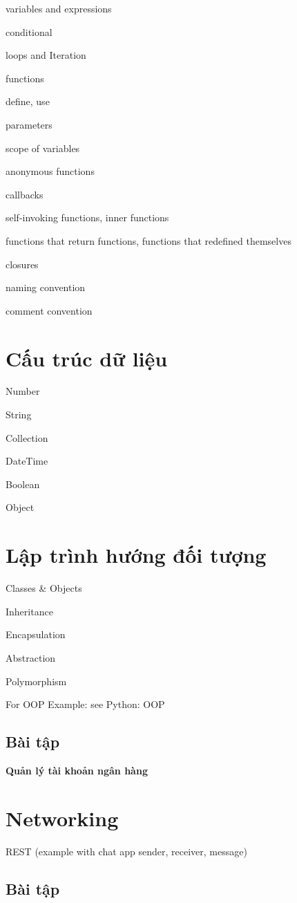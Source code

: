 variables and expressions

conditional

loops and Iteration

functions

define, use

parameters

scope of variables

anonymous functions

callbacks

self-invoking functions, inner functions

functions that return functions, functions that redefined themselves

closures

naming convention

comment convention

\section{Cấu trúc dữ liệu}

Number

String

Collection

DateTime

Boolean

Object

\section{Lập trình hướng đối tượng}

Classes & Objects

Inheritance

Encapsulation

Abstraction

Polymorphism

For OOP Example: see Python: OOP

\subsection{Bài tập}

\textbf{Quản lý tài khoản ngân hàng}

\section{Networking}

REST (example with chat app sender, receiver, message)

\subsection{Bài tập}

